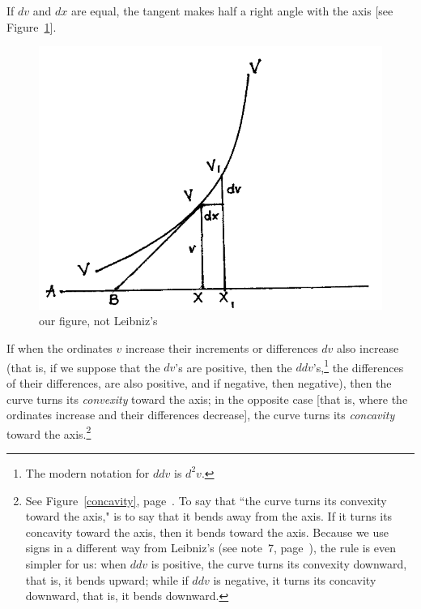 \documentclass[polutonikogreek,english,twoside,openright]{article}
\begin{document}
If $dv$ and $dx$ are equal, the tangent makes half a right angle with
the axis [see Figure~\ref{45deg}].
\begin{figure}[htp]
  \begin{center}
    \includegraphics[width=.65\textwidth]{fig/Figure7}
    \caption{our figure, not Leibniz's}
    \label{45deg}
  \end{center}
\end{figure} If when the ordinates $v$ increase their increments or
differences $dv$ also increase (that is, if we suppose that the $dv$'s
are positive, then the $ddv$'s,\footnote{The modern notation for $ddv$
  is $d^2v$.}  the differences of their differences, are also
positive, and if negative, then negative), then the curve turns its
{\em convexity} toward the axis; in the opposite case [that is, where
the ordinates increase and their differences decrease], the curve
turns its {\em concavity} toward the axis.\footnote{See
  Figure~\ref{concavity}, page~\pageref{concavity}.  To say that ``the
  curve turns its convexity toward the axis," is to say that it bends
  away from the axis.  If it turns its concavity toward the
  axis, then it bends toward the axis.  Because we use signs in a
  different way from Leibniz's (see note~7, page~\pageref{cnm7}), the
  rule is even simpler for us: when $ddv$ is positive, the curve turns
  its convexity downward, that is, it bends upward; while if $ddv$ is
  negative, it turns its concavity downward, that is, it bends
  downward.}
\end{document}
